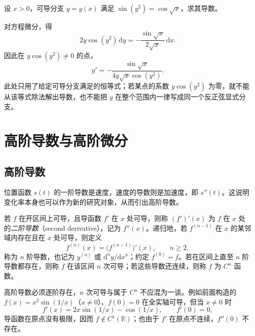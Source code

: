 \begin{example}
\label{ex:implicit-differentiation-using-differentials}
设 $x>0$，可导分支 $y=y(x)$ 满足 $\sin(y^2)=\cos\sqrt{x}$，求其导数。
\end{example}
\begin{solve}
对方程微分，得
\[
    2y\cos(y^2)\,\mathrm dy
    =-\frac{\sin\sqrt{x}}{2\sqrt{x}}\,\mathrm dx.
\]
因此在 $y\cos(y^2)\ne0$ 的点，
\[
    y'=-\frac{\sin\sqrt{x}}{4y\sqrt{x}\cos(y^2)}.
\]
此处只用了给定可导分支满足的恒等式；若某点的系数 $y\cos(y^2)$ 为零，就不能从该等式除法解出导数，也不能把 $y$ 在整个范围内一律写成同一个反正弦显式分支。
\end{solve}

\section{高阶导数与高阶微分}
\label{sec:higher-derivatives-and-differentials}

\subsection{高阶导数}
\label{subsec:higher-derivatives}

位置函数 $s(t)$ 的一阶导数是速度，速度的导数则是加速度，即 $s''(t)$。这说明变化率本身也可以作为新的研究对象，从而引出高阶导数。

\begin{definition}
\label{def:higher-order-derivatives}
若 $f$ 在开区间上可导，且导函数 $f'$ 在 $x$ 处可导，则称 $(f')'(x)$ 为 $f$ 在 $x$ 处的\emph{二阶导数}（second derivative），记为 $f''(x)$。递归地，若 $f^{(n-1)}$ 在 $x$ 的某邻域内存在且在 $x$ 处可导，则定义
\[
    f^{(n)}(x)=\bigl(f^{(n-1)}\bigr)'(x),\qquad n\geq2,
\]
称为 $n$ 阶导数，也记为 $y^{(n)}$ 或 $\mathrm d^ny/\mathrm dx^n$；约定 $f^{(0)}=f$。若在区间上直至 $n$ 阶导数都存在，则称 $f$ 在该区间 $n$ 次可导；若这些导数还连续，则称 $f$ 为 $C^n$ 函数。
\end{definition}

高阶导数必须逐阶存在，$n$ 次可导与属于 $C^n$ 不应混为一谈。例如前面构造的 $f(x)=x^2\sin(1/x)$（$x\ne0$）、$f(0)=0$ 在全实轴可导，但当 $x\ne0$ 时
\[
    f'(x)=2x\sin(1/x)-\cos(1/x),\qquad f'(0)=0,
\]
导函数在原点没有极限，因而 $f\notin C^1(\mathbb R)$；也由于 $f'$ 在原点不连续，$f''(0)$ 不存在。

